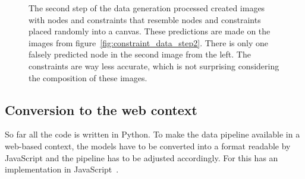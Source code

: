 \begin{figure}
\begin{subfigure}[b]{0.19\textwidth}
    \end{subfigure}
    \begin{subfigure}[b]{0.19\textwidth}
    \end{subfigure}
    \caption[Predictions of the first prototype on the generated data]{The second step of the data generation processed created images with nodes and constraints that resemble nodes and constraints placed randomly into a canvas. These predictions are made on the images from figure~\ref{fig:constraint_data_step2}. There is only one falsely predicted node in the second image from the left. The constraints are way less accurate, which is not surprising considering the composition of these images.}\label{fig:constraint_data_step3}
\end{figure}

\subsection{Conversion to the web context}\label{ch:conversion_to_web_context}

So far all the code is written in Python.
To make the data pipeline available in a web-based context, the models have to be converted into a format readable by JavaScript and the pipeline has to be adjusted accordingly.
For this  has an implementation in JavaScript~\cite{Google2021a}.

